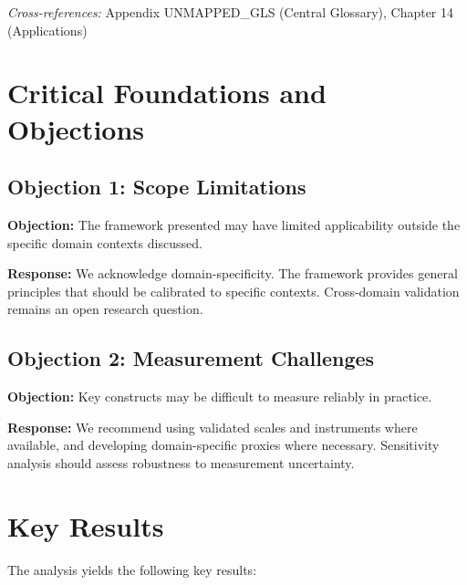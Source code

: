 \noindent\textit{Cross-references:}
Appendix UNMAPPED_GLS (Central Glossary), Chapter 14 (Applications)



\section{Critical Foundations and Objections}
\label{sec:ari-foundations}

\subsection{Objection 1: Scope Limitations}

\textbf{Objection:} The framework presented may have limited applicability
outside the specific domain contexts discussed.

\textbf{Response:} We acknowledge domain-specificity. The framework provides
general principles that should be calibrated to specific contexts. Cross-domain
validation remains an open research question.

\subsection{Objection 2: Measurement Challenges}

\textbf{Objection:} Key constructs may be difficult to measure reliably in
practice.

\textbf{Response:} We recommend using validated scales and instruments where
available, and developing domain-specific proxies where necessary. Sensitivity
analysis should assess robustness to measurement uncertainty.





\section{Key Results}
\label{sec:ari-results}

The analysis yields the following key results:

